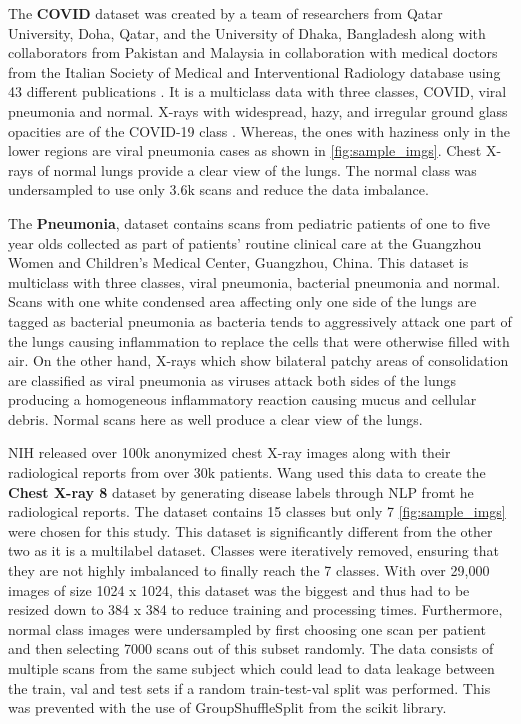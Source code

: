 \documentclass[10pt,twocolumn,letterpaper]{article}
\begin{document}
The \textbf{COVID} dataset was created by a team of researchers from Qatar University, Doha, 
Qatar, and the University of Dhaka, Bangladesh along with collaborators from Pakistan 
and Malaysia in collaboration with medical doctors from the Italian Society of Medical 
and Interventional Radiology database using 43 \cite{covidpneumonia2020data} different 
publications \cite{RAHMAN2021104319,9144185,kagglecovid}. It is a multiclass data with 
three classes, COVID, viral pneumonia and normal. X-rays with widespread, hazy, 
and irregular ground glass opacities are of the COVID-19 class \cite{jacobi2020portable}. 
Whereas, the ones with haziness only in the lower regions \cite{zhan2021clinical} are 
viral pneumonia cases as shown in \cref{fig:sample_imgs}. Chest X-rays of normal lungs provide 
a clear view of the lungs. The normal class was undersampled to use only 3.6k scans and reduce the 
data imbalance.

The \textbf{Pneumonia}, dataset contains scans from pediatric patients of one to five year olds 
collected as part of patients' routine clinical care at the Guangzhou Women and Children's 
Medical Center, Guangzhou, China. \cite{kermany2018labeled,kagglepneu} 
This dataset is multiclass with three classes, viral pneumonia, bacterial pneumonia and normal.
Scans with one white condensed area affecting only one 
side of the lungs are tagged as bacterial pneumonia\cite{areviral} as bacteria tends to 
aggressively attack one part of the lungs causing inflammation to replace the cells 
that were otherwise filled with air. On the other hand, X-rays which 
show bilateral patchy areas of consolidation are classified as viral pneumonia
\cite{guo2012radiological} as viruses attack both sides of the lungs producing a 
homogeneous inflammatory reaction causing mucus and cellular debris. Normal scans here as well 
produce a clear view of the lungs. 

NIH \cite{chestxray2017data} released over 100k anonymized chest X-ray images along with 
their radiological reports from over 30k patients. Wang \etal \cite{wang2017chestx} 
used this data to create the \textbf{Chest X-ray 8} dataset by generating disease labels 
through NLP fromt he radiological reports. \cite{kaggle8} The dataset contains 15 classes but only 
7 \cref{fig:sample_imgs} were chosen for this study. This dataset is significantly different from the 
other two as it is a multilabel dataset. Classes were iteratively removed, ensuring that
they are not highly imbalanced to finally reach the 7 classes. With over 29,000 images of size 
1024 x 1024, this dataset was the biggest and thus had to be resized down to 384 x 384 to 
reduce training and processing times. Furthermore, normal class images were undersampled by first
choosing one scan per patient and then selecting 7000 scans out of this subset randomly. 
The data consists of multiple scans from the same subject which could lead to data leakage between 
the train, val and test sets if a random train-test-val split was performed. 
This was prevented with the use of GroupShuffleSplit from the scikit library. 
\end{document}
